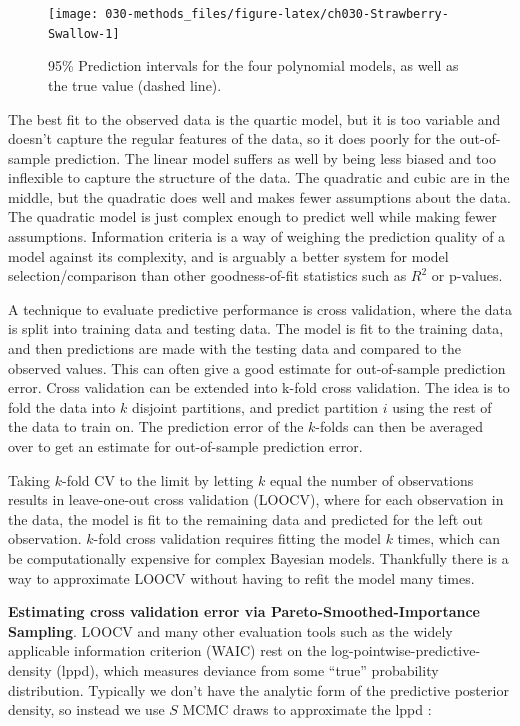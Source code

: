 \documentclass[11pt, oneside, openany]{scrbook}
\begin{document}
\begin{figure}

{\centering \texttt{[image: 030-methods\_files/figure-latex/ch030-Strawberry-Swallow-1]} 

}

\caption{95\% Prediction intervals for the four polynomial models, as well as the true value (dashed line).}\label{fig:ch030-Strawberry-Swallow}
\end{figure}

The best fit to the observed data is the quartic model, but it is too variable and doesn't capture the regular features of the data, so it does poorly for the out-of-sample prediction. The linear model suffers as well by being less biased and too inflexible to capture the structure of the data. The quadratic and cubic are in the middle, but the quadratic does well and makes fewer assumptions about the data. The quadratic model is just complex enough to predict well while making fewer assumptions. Information criteria is a way of weighing the prediction quality of a model against its complexity, and is arguably a better system for model selection/comparison than other goodness-of-fit statistics such as \(R^2\) or p-values.

A technique to evaluate predictive performance is cross validation, where the data is split into training data and testing data. The model is fit to the training data, and then predictions are made with the testing data and compared to the observed values. This can often give a good estimate for out-of-sample prediction error. Cross validation can be extended into k-fold cross validation. The idea is to fold the data into \(k\) disjoint partitions, and predict partition \(i\) using the rest of the data to train on. The prediction error of the \(k\)-folds can then be averaged over to get an estimate for out-of-sample prediction error.

Taking \(k\)-fold CV to the limit by letting \(k\) equal the number of observations results in leave-one-out cross validation (LOOCV), where for each observation in the data, the model is fit to the remaining data and predicted for the left out observation. \(k\)-fold cross validation requires fitting the model \(k\) times, which can be computationally expensive for complex Bayesian models. Thankfully there is a way to approximate LOOCV without having to refit the model many times.

\textbf{Estimating cross validation error via Pareto-Smoothed-Importance Sampling}. LOOCV and many other evaluation tools such as the widely applicable information criterion (WAIC) rest on the log-pointwise-predictive-density (lppd), which measures deviance from some ``true'' probability distribution. Typically we don't have the analytic form of the predictive posterior density, so instead we use \(S\) MCMC draws to approximate the lppd \citep{vehtari2017practical}:
\end{document}
